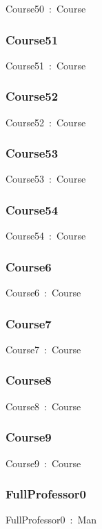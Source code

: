 \documentclass{article}
\begin{document}
Course50~:~Course

\subsubsection*{Course51}

Course51~:~Course

\subsubsection*{Course52}

Course52~:~Course

\subsubsection*{Course53}

Course53~:~Course

\subsubsection*{Course54}

Course54~:~Course

\subsubsection*{Course6}

Course6~:~Course

\subsubsection*{Course7}

Course7~:~Course

\subsubsection*{Course8}

Course8~:~Course

\subsubsection*{Course9}

Course9~:~Course

\subsubsection*{FullProfessor0}

FullProfessor0~:~Man
\end{document}
